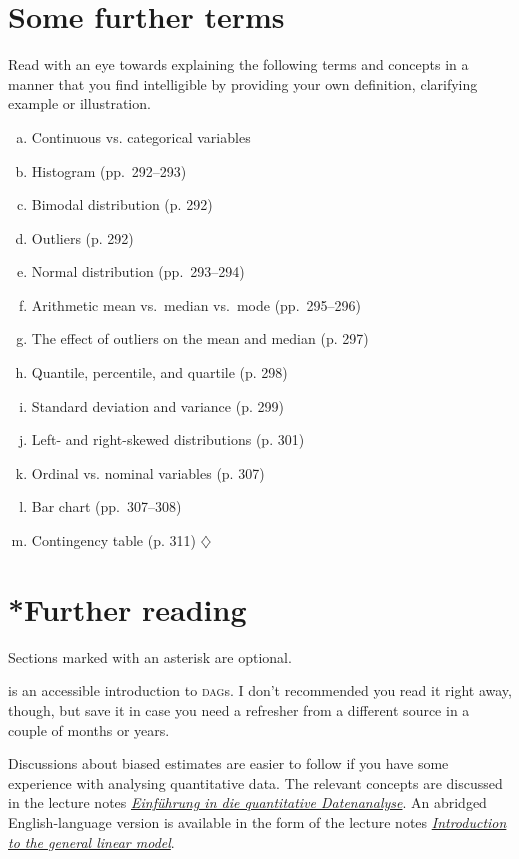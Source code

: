 \documentclass[a4paper]{tufte-book}\usepackage[]{graphicx}\usepackage[]{xcolor}
\newcommand*{\parend}[1][$\diamondsuit$]{%
\leavevmode\unskip\penalty9999 \hbox{}\nobreak\hfill
    \quad\hbox{#1}%
}
\begin{document}
\section{Some further terms}
\label{ex:johnson}
Read \citet{Johnson2013} with an eye towards
explaining the following terms and
concepts in a manner that you find intelligible by providing
your own definition, clarifying example or illustration.

\begin{enumerate}[(a)]
 \item Continuous vs. categorical variables \citep[pp.~289--290 in][]{Johnson2013}
 \item Histogram (pp.~292--293)
 \item Bimodal distribution (p. 292)
 \item Outliers (p. 292)
 \item Normal distribution (pp.~293--294)
 \item Arithmetic mean vs.\ median vs.\ mode (pp.~295--296)
 \item The effect of outliers on the mean and median (p. 297)
 \item Quantile, percentile, and quartile (p. 298)
 \item Standard deviation and variance (p. 299)
 \item Left- and right-skewed distributions (p. 301)
 \item Ordinal vs. nominal variables (p. 307)
 \item Bar chart (pp.~307--308)
 \item Contingency table (p. 311) \parend
\end{enumerate}

\section{*Further reading}
Sections marked with an asterisk are optional.

\citet{Rohrer2018} is an accessible introduction to \textsc{dag}s.
I don't recommended you read it right away, though,
but save it in case you need a refresher from a different source
in a couple of months or years.

Discussions about biased estimates are easier to follow
if you have some experience with analysing quantitative data.
The relevant concepts are discussed in the lecture notes
\href{https://janhove.github.io/resources.html#einführung-in-die-quantitative-datenanalyse}{\textit{Einführung in die quantitative Datenanalyse}}.
An abridged English-language version is available in the form
of the lecture notes \href{https://janhove.github.io/resources.html#introduction-to-the-general-linear-model}{\textit{Introduction to the general linear model}}.
\end{document}
